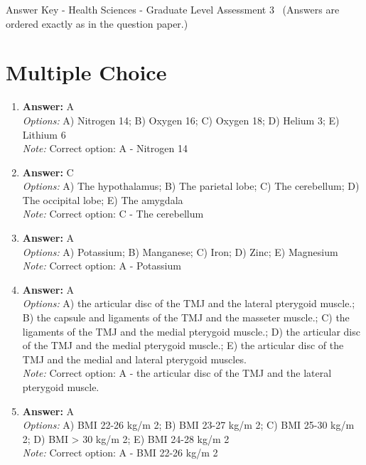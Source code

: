 \documentclass[12pt]{article}
\begin{document}
\begin{center}
Answer Key - Health Sciences - Graduate Level Assessment 3 \
\small (Answers are ordered exactly as in the question paper.)
\end{center}

\section*{Multiple Choice}
\begin{enumerate}[label=\arabic*.]
\item \textbf{Answer:} A
\\ \textit{Options:} A) Nitrogen 14; B) Oxygen 16; C) Oxygen 18; D) Helium 3; E) Lithium 6
\\ \textit{Note:} Correct option: A - Nitrogen 14
\item \textbf{Answer:} C
\\ \textit{Options:} A) The hypothalamus; B) The parietal lobe; C) The cerebellum; D) The occipital lobe; E) The amygdala
\\ \textit{Note:} Correct option: C - The cerebellum
\item \textbf{Answer:} A
\\ \textit{Options:} A) Potassium; B) Manganese; C) Iron; D) Zinc; E) Magnesium
\\ \textit{Note:} Correct option: A - Potassium
\item \textbf{Answer:} A
\\ \textit{Options:} A) the articular disc of the TMJ and the lateral pterygoid muscle.; B) the capsule and ligaments of the TMJ and the masseter muscle.; C) the ligaments of the TMJ and the medial pterygoid muscle.; D) the articular disc of the TMJ and the medial pterygoid muscle.; E) the articular disc of the TMJ and the medial and lateral pterygoid muscles.
\\ \textit{Note:} Correct option: A - the articular disc of the TMJ and the lateral pterygoid muscle.
\item \textbf{Answer:} A
\\ \textit{Options:} A) BMI 22-26 kg/m 2; B) BMI 23-27 kg/m 2; C) BMI 25-30 kg/m 2; D) BMI \textgreater{} 30 kg/m 2; E) BMI 24-28 kg/m 2
\\ \textit{Note:} Correct option: A - BMI 22-26 kg/m 2
\end{enumerate}
\end{document}
